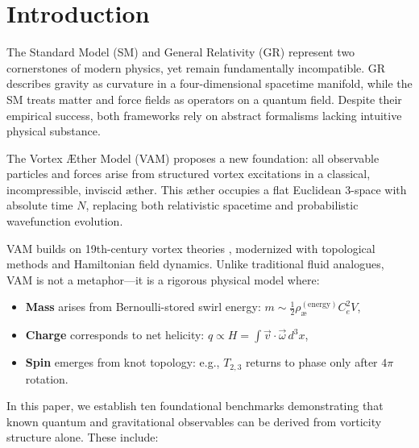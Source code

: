 \section{Introduction}

The Standard Model (SM) and General Relativity (GR) represent two cornerstones of modern physics, yet remain fundamentally incompatible. GR describes gravity as curvature in a four-dimensional spacetime manifold, while the SM treats matter and force fields as operators on a quantum field. Despite their empirical success, both frameworks rely on abstract formalisms lacking intuitive physical substance.

The Vortex \AE{}ther Model (VAM) proposes a new foundation: all observable particles and forces arise from structured vortex excitations in a classical, incompressible, inviscid æther. This æther occupies a flat Euclidean 3-space with absolute time \( N \), replacing both relativistic spacetime and probabilistic wavefunction evolution.

VAM builds on 19th-century vortex theories \cite{helmholtz1858integrals, thomson1867vortex}, modernized with topological methods and Hamiltonian field dynamics. Unlike traditional fluid analogues, VAM is not a metaphor—it is a rigorous physical model where:

\begin{itemize}
    \item \textbf{Mass} arises from Bernoulli-stored swirl energy: \( m \sim \frac{1}{2} \rho_\text{\ae}^{(\text{energy})} C_e^2 V \),
    \item \textbf{Charge} corresponds to net helicity: \( q \propto H = \int \vec{v} \cdot \vec{\omega} \, d^3x \),
    \item \textbf{Spin} emerges from knot topology: e.g., \( T_{2,3} \) returns to phase only after \( 4\pi \) rotation.
\end{itemize}

In this paper, we establish ten foundational benchmarks demonstrating that known quantum and gravitational observables can be derived from vorticity structure alone. These include:

